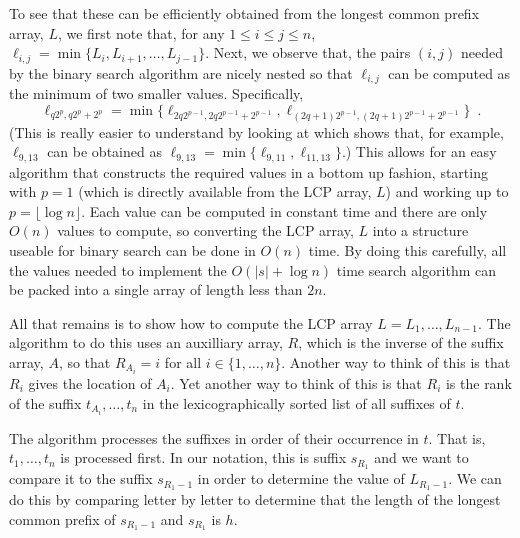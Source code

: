 To see that these can be efficiently obtained from the longest common
prefix array, $L$, we first note that, for any $1\le i\le j\le n$,
$\ell_{i,j}=\min\{L_i,L_{i+1},\ldots,L_{j-1}\}$.  Next, we observe that,
the pairs $(i,j)$ needed by the binary search algorithm are nicely nested
so that $\ell_{i,j}$ can be computed as the minimum of two smaller values.
Specifically,
\[
    \ell_{q2^p,q2^p+2^{p}} = \min\{\ell_{2q 2^{p-1},2q 2^{p-1}+2^{p-1}}, \ell_{(2q+1) 2^{p-1},(2q+1) 2^{p-1}+2^{p-1}}\} \enspace .
\]
(This is really easier to understand by looking at  which shows that, for example, $\ell_{9,13}$ can be obtained as $\ell_{9,13}=\min\{\ell_{9,11},\ell_{11,13}\}$.)
This allows for an easy algorithm that constructs the required values in
a bottom up fashion, starting with $p=1$ (which is directly available
from the LCP array, $L$) and working up to $p=\lfloor\log n\rfloor$.
Each value can be computed in constant time and there are only $O(n)$
values to compute, so converting the LCP array, $L$ into a structure
useable for binary search can be done in $O(n)$ time.  By doing this
carefully, all the values needed to implement the $O(|s|+\log n)$
time search algorithm can be packed into a single array of length less
than $2n$.

All that remains is to show how to compute the LCP array
$L=L_1,\ldots,L_{n-1}$.  The algorithm to do this uses an auxilliary
array, $R$, which is the inverse of the suffix array, $A$, so that
$R_{A_i} = i$ for all $i\in\{1,\ldots,n\}$.  Another way to think of this
is that $R_i$ gives the location of $A_i$.  Yet another way to think
of this is that $R_i$ is the rank of the suffix $t_{A_i},\ldots,t_n$
in the lexicographically sorted list of all suffixes of $t$.

The algorithm processes the suffixes in order of their occurrence in $t$.
That is, $t_1,\ldots,t_n$ is processed first.  In our notation, this is
suffix $s_{R_1}$ and we want to compare it to the suffix $s_{R_1-1}$
in order to determine the value of $L_{R_1-1}$.  We can do this by
comparing letter by letter to determine that the length of the longest
common prefix of $s_{R_1-1}$ and $s_{R_1}$ is $h$.

